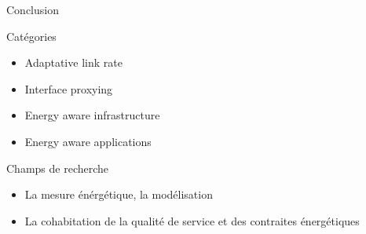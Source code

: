 \begin{frame}{Conclusion}
\begin{block}{Catégories}
\begin{itemize}
\item Adaptative link rate
\item Interface proxying
\item Energy aware infrastructure
\item Energy aware applications
\end{itemize}
\end{block}

\begin{block}{Champs de recherche}
\begin{itemize}
\item La mesure énérgétique, la modélisation
\item La cohabitation de la qualité de service et des contraites énergétiques
\end{itemize}
\end{block}
\end{frame}


